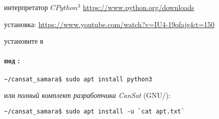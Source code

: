 \clearpage
\subsecly{\py}\label{pynst}

интерпретатор $CPython^3$ \url{https://www.python.org/downloads}

\bigskip
установка: \url{https://www.youtube.com/watch?v=IU4-19ofajg&t=150}

\bigskip
установите в 

\paragraph{под \linux:}
\begin{verbatim}
~/cansat_samara$ sudo apt install python3
\end{verbatim}
или \emph{полный комплект разработчика CanSat} (GNU/\linux):
\begin{verbatim}
~/cansat_samara$ sudo apt install -u `cat apt.txt`
\end{verbatim}

